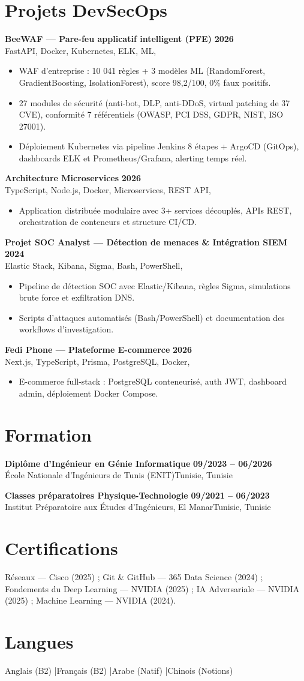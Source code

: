 \documentclass[a4paper,10pt]{article}
\newcommand{\cventry}[4]{\textbf{#1} \hfill \textbf{#4}\\[1pt]#2{\ifx\relax#3\relax\else, #3\fi}\par\vspace{2pt}}
\begin{document}
\section{Projets DevSecOps}
\cventry{BeeWAF — Pare-feu applicatif intelligent (PFE)}{FastAPI, Docker, Kubernetes, ELK, ML}{}{2026}
\begin{itemize}
  \item WAF d'entreprise : 10 041 règles + 3 modèles ML (RandomForest, GradientBoosting, IsolationForest), score 98,2/100, 0\% faux positifs.
  \item 27 modules de sécurité (anti-bot, DLP, anti-DDoS, virtual patching de 37 CVE), conformité 7 référentiels (OWASP, PCI DSS, GDPR, NIST, ISO 27001).
  \item Déploiement Kubernetes via pipeline Jenkins 8 étapes + ArgoCD (GitOps), dashboards ELK et Prometheus/Grafana, alerting temps réel.
\end{itemize}
\cventry{Architecture Microservices}{TypeScript, Node.js, Docker, Microservices, REST API}{}{2026}
\begin{itemize}
  \item Application distribuée modulaire avec 3+ services découplés, APIs REST, orchestration de conteneurs et structure CI/CD.
\end{itemize}
\cventry{Projet SOC Analyst — Détection de menaces \& Intégration SIEM}{Elastic Stack, Kibana, Sigma, Bash, PowerShell}{}{2024}
\begin{itemize}
  \item Pipeline de détection SOC avec Elastic/Kibana, règles Sigma, simulations brute force et exfiltration DNS.
  \item Scripts d'attaques automatisés (Bash/PowerShell) et documentation des workflows d'investigation.
\end{itemize}
\cventry{Fedi Phone — Plateforme E-commerce}{Next.js, TypeScript, Prisma, PostgreSQL, Docker}{}{2026}
\begin{itemize}
  \item E-commerce full-stack : PostgreSQL conteneurisé, auth JWT, dashboard admin, déploiement Docker Compose.
\end{itemize}
\section{Formation}
\cventry{Diplôme d'Ingénieur en Génie Informatique}{École Nationale d'Ingénieurs de Tunis (ENIT)}{Tunisie}{09/2023 -- 06/2026}
\cventry{Classes préparatoires Physique-Technologie}{Institut Préparatoire aux Études d'Ingénieurs, El Manar}{Tunisie}{09/2021 -- 06/2023}
\section{Certifications}
Réseaux — Cisco (2025) ; Git \& GitHub — 365 Data Science (2024) ; Fondements du Deep Learning — NVIDIA (2025) ; IA Adversariale — NVIDIA (2025) ; Machine Learning — NVIDIA (2024).
\section{Langues}
Anglais (B2) \quad|\quad Français (B2) \quad|\quad Arabe (Natif) \quad|\quad Chinois (Notions)
\end{document}

